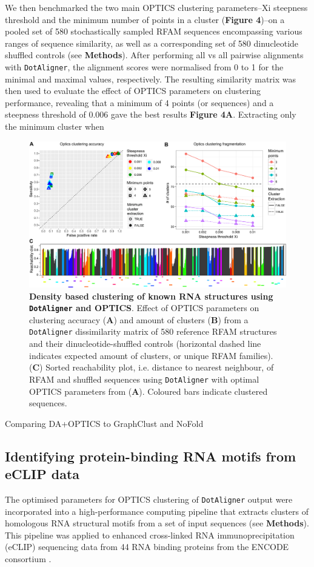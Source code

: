 \documentclass[a4paper,11pt]{article}
\newcommand\dotaligner{\texttt{DotAligner}}
\begin{document}
We then benchmarked the two main OPTICS clustering parameters--Xi steepness threshold 
and the minimum number of points in a cluster (\textbf{Figure 4})--on a pooled set of 580 
stochastically sampled RFAM sequences encompassing various ranges of sequence similarity, 
as well as a corresponding set of 580 dinucleotide shuffled controls (see \textbf{Methods}). 
After performing all vs all pairwise alignments with \dotaligner{}, 
the alignment scores were normalised from 0 to 1 for the minimal and maximal values, respectively. 
The resulting similarity matrix was then used to evaluate the effect of OPTICS parameters on clustering performance, revealing that a minimum of 4 points (or sequences) and a steepness threshold of 0.006 
gave the best results \textbf{Figure 4A}. 
Extracting only the minimum cluster when 
\\

  \begin{figure}
 \includegraphics[width=\textwidth]{fig4}
 \caption { \textbf{Density based clustering of known RNA structures using \dotaligner{} 
 and OPTICS}. Effect of OPTICS parameters on clustering accuracy (\textbf{A}) and amount 
 of clusters (\textbf{B}) from a \dotaligner{} dissimilarity matrix of 580 reference RFAM 
 structures and their dinucleotide-shuffled controls (horizontal dashed line indicates 
 expected amount of clusters, or unique RFAM families). (\textbf{C}) Sorted reachability plot,
 i.e. distance to nearest neighbour, of RFAM and shuffled sequences using \dotaligner{} 
 with optimal OPTICS parameters from (\textbf{A}). Coloured bars indicate clustered sequences. 
 }
\end{figure}


Comparing DA+OPTICS to GraphClust and NoFold

\subsection*{ Identifying protein-binding RNA motifs from eCLIP data }
The optimised parameters for OPTICS clustering of \dotaligner{} output were incorporated into 
a high-performance computing pipeline that extracts clusters of homologous RNA structural motifs from a set of input sequences (see \textbf{Methods}).  This pipeline was applied to enhanced cross-linked 
RNA immunoprecipitation (eCLIP) sequencing data from 44 RNA binding proteins from the ENCODE consortium  \cite{van2016robust}. 
\end{document}
